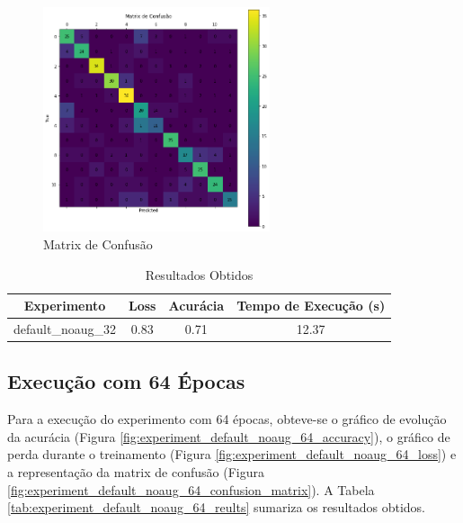 \documentclass[12pt]{article}
\begin{document}
\begin{figure}[!htb]
  \centering
  \includegraphics[width=18em]{experiments/default_noaug_32/confusion_matrix.png}
  \caption{Matrix de Confusão}
  \label{fig:experiment_default_noaug_32_confusion_matrix}
\end{figure}

\begin{table}[!htb]
  \centering
  \begin{tabular}{|c|c|c|c|}
    \hline
    \textbf{Experimento} & \textbf{Loss} & \textbf{Acurácia} & \textbf{Tempo de Execução (s)} \\ \hline
    default\_noaug\_32   & 0.83          & 0.71              & 12.37                          \\ \hline
  \end{tabular}
  \caption{Resultados Obtidos}
  \label{tab:experiment_default_noaug_32_reults}
\end{table}

\newpage

\subsection{Execução com 64 Épocas}

Para a execução do experimento com 64 épocas, obteve-se o gráfico de evolução da acurácia (Figura \ref{fig:experiment_default_noaug_64_accuracy}), o gráfico de perda durante o treinamento (Figura \ref{fig:experiment_default_noaug_64_loss}) e a representação da matrix de confusão (Figura \ref{fig:experiment_default_noaug_64_confusion_matrix}). A Tabela \ref{tab:experiment_default_noaug_64_reults} sumariza os resultados obtidos.
\end{document}
